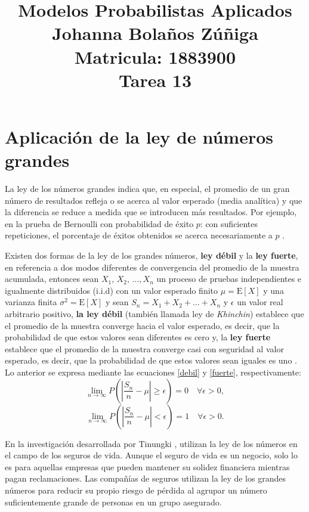 \documentclass{article}
\title{
\centering
Modelos Probabilistas Aplicados \\
Johanna Bolaños Zúñiga \\
Matricula: 1883900\\
Tarea 13
}
\date{}
\begin{document}
\maketitle

\section{Aplicación de la ley de números grandes}

La ley de los números grandes indica que, en especial, el promedio de un gran número de resultados refleja o se acerca al valor esperado (media analítica) y que la diferencia se reduce a medida que se introducen más resultados. Por ejemplo, en la prueba de Bernoulli con probabilidad de éxito $p$: con suficientes repeticiones, el porcentaje de éxitos obtenidos se acerca necesariamente a $p$ \cite{notasElisa}.

Existen dos formas de la ley de los grandes números, \textbf{ley débil} y la \textbf{ley fuerte}, en referencia a dos modos diferentes de convergencia del promedio de la muestra acumulada, entonces sean $X_{1}, \, X_{2}, \, \dots , X_{n}$ un proceso de pruebas independientes e igualmente distribuidos (i.i.d) con un valor esperado finito $\mu = \text{E}[X]$ y una varianza finita $\sigma^2 = \text{E}[X]$ y sean $S_{n} = X_{1} + X_{2} + \dots + X_{n}$ y $\epsilon$ un valor real arbitrario positivo, \textbf{la ley débil} (también llamada ley de \textit{Khinchin}) establece que el promedio de la muestra converge hacia el valor esperado, es decir, que la probabilidad de que estos valores sean diferentes es cero y, la \textbf{ley fuerte} establece que el promedio de la muestra converge casi con seguridad al valor esperado, es decir, que la probabilidad de que estos valores sean iguales es uno  \cite{Loeve}. Lo anterior se expresa mediante las ecuaciones \ref{debil} y \ref{fuerte}, respectivamente:
\begin{equation} 
\lim_{n \to \infty}P\left(\left |\frac{S_{n}}{n}-\mu \right | \geq \epsilon \right) = 0 \quad \forall \epsilon >0,
\label{debil}
\end{equation}
\begin{equation} 
\lim_{n \to \infty}P\left(\left |\frac{S_{n}}{n}-\mu \right | < \epsilon \right) = 1 \quad \forall \epsilon >0.
\label{fuerte}
\end{equation}

En la investigación desarrollada por Tinungki \cite{Tinungki}, utilizan la ley de los números en el campo de los seguros de vida. Aunque el seguro de vida es un negocio, solo lo es para aquellas empresas que pueden mantener su solidez financiera mientras pagan reclamaciones. Las compañías de seguros utilizan la ley de los grandes números para reducir su propio riesgo de pérdida al agrupar un número suficientemente grande de personas en un grupo asegurado.
\end{document}
